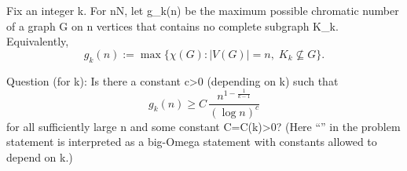 Fix an integer k.
For n\in\mathbb N, let g_k(n) be the maximum possible chromatic number of a graph G on n vertices that contains no complete subgraph K_k.
Equivalently,
\[g_k(n):=\max\{\chi(G): |V(G)|=n,\; K_k\not\subseteq G\}.\]

Question (for k): Is there a constant c>0 (depending on k) such that
\[ g_k(n) \ge C\, \frac{n^{1-\frac{1}{k-1}}}{(\log n)^c} \]
for all sufficiently large n and some constant C=C(k)>0?
(Here “\gg” in the problem statement is interpreted as a big-Omega statement with constants allowed to depend on k.)
